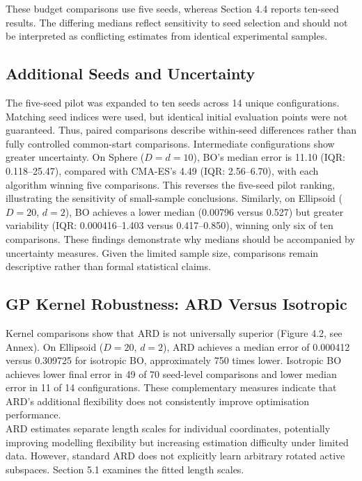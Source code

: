 \documentclass[11pt]{article}
\begin{document}
\noindent These budget comparisons use five seeds, whereas Section 4.4 reports ten-seed results. The differing medians reflect sensitivity to seed selection and should not be interpreted as conflicting estimates from identical experimental samples.\\



\subsection{Additional Seeds and Uncertainty}
\noindent The five-seed pilot was expanded to ten seeds across 14 unique configurations. Matching seed indices were used, but identical initial evaluation points were not guaranteed. Thus, paired comparisons describe within-seed differences rather than fully controlled common-start comparisons. Intermediate configurations show greater uncertainty. On Sphere ($D=d=10$), BO's median error is 11.10 (IQR: 0.118–25.47), compared with CMA-ES's 4.49 (IQR: 2.56–6.70), with each algorithm winning five comparisons. This reverses the five-seed pilot ranking, illustrating the sensitivity of small-sample conclusions. Similarly, on Ellipsoid ($D=20$, $d=2$), BO achieves a lower median (0.00796 versus 0.527) but greater variability (IQR: 0.000416–1.403 versus 0.417–0.850), winning only six of ten comparisons. These findings demonstrate why medians should be accompanied by uncertainty measures. Given the limited sample size, comparisons remain descriptive rather than formal statistical claims.

\subsection{GP Kernel Robustness: ARD Versus Isotropic}

\noindent Kernel comparisons show that ARD is not universally superior (Figure 4.2, see Annex). On Ellipsoid ($D=20$, $d=2$), ARD achieves a median error of 0.000412 versus 0.309725 for isotropic BO, approximately 750 times lower. Isotropic BO achieves lower final error in 49 of 70 seed-level comparisons and lower median error in 11 of 14 configurations. These complementary measures indicate that ARD's additional flexibility does not consistently improve optimisation performance.\\

\noindent ARD estimates separate length scales for individual coordinates, potentially improving modelling flexibility but increasing estimation difficulty under limited data. However, standard ARD does not explicitly learn arbitrary rotated active subspaces. Section 5.1 examines the fitted length scales.
\end{document}
